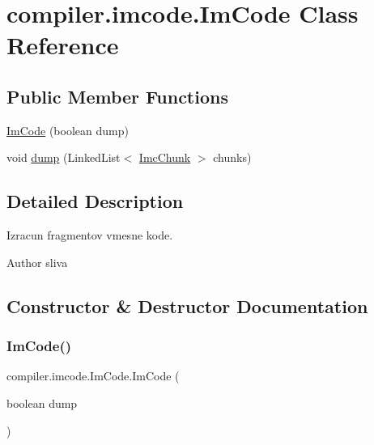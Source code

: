 \hypertarget{classcompiler_1_1imcode_1_1_im_code}{}\section{compiler.\+imcode.\+Im\+Code Class Reference}
\label{classcompiler_1_1imcode_1_1_im_code}
\subsection*{Public Member Functions}
\begin{DoxyCompactItemize}
\item 
\hyperlink{classcompiler_1_1imcode_1_1_im_code_a77b9419bea9b527ffc928e90586457e1}{Im\+Code} (boolean dump)
\item 
void \hyperlink{classcompiler_1_1imcode_1_1_im_code_adabd673785a066bfbfd206e6438299da}{dump} (Linked\+List$<$ \hyperlink{classcompiler_1_1imcode_1_1_imc_chunk}{Imc\+Chunk} $>$ chunks)
\end{DoxyCompactItemize}


\subsection{Detailed Description}
Izracun fragmentov vmesne kode.

\begin{DoxyAuthor}{Author}
sliva 
\end{DoxyAuthor}


\subsection{Constructor \& Destructor Documentation}
\mbox{\label{classcompiler_1_1imcode_1_1_im_code_a77b9419bea9b527ffc928e90586457e1}} 
\subsubsection{\texorpdfstring{Im\+Code()}{ImCode()}}
{\footnotesize\ttfamily compiler.\+imcode.\+Im\+Code.\+Im\+Code (\begin{DoxyParamCaption}\item[{boolean}]{dump }\end{DoxyParamCaption})}

